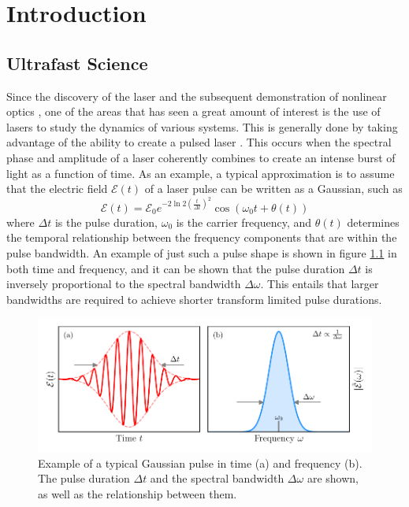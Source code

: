 \chapter{Introduction}
\label{chap:Intro}


\section{Ultrafast Science}

Since the discovery of the laser \cite{schawlowInfraredOpticalMasers1958, maimanStimulatedOpticalRadiation1960} and the subsequent demonstration of nonlinear optics \cite{frankenGenerationOpticalHarmonics1961, armstrongInteractionsLightWaves1962}, one of the areas that has seen a great amount of interest is the use of lasers to study the dynamics of various systems.  This is generally done by taking advantage of the ability to create a pulsed laser \cite{demariaPicosecondLaserPulses1971}.  This occurs when the spectral phase and amplitude of a laser coherently combines to create an intense burst of light as a function of time.  As an example, a typical approximation is to assume that the electric field $\mathcal{E}(t)$ of a laser pulse can be written as a Gaussian, such as
\begin{equation}
	\label{eqn:gaussian_pulse}
	\mathcal{E}(t) = \mathcal{E}_0 e^{-2\ln 2(\frac{t}{\Delta t})^2}\cos(\omega_0 t + \theta(t))
\end{equation}
where $\Delta t$ is the pulse duration, $\omega_0$ is the carrier frequency, and $\theta(t)$ determines the temporal relationship between the frequency components that are within the pulse bandwidth.  An example of just such a pulse shape is shown in figure \ref{fig:gaussian_pulse} in both time and frequency, and it can be shown that the pulse duration $\Delta t$ is inversely proportional to the spectral bandwidth $\Delta\omega$.  This entails that larger bandwidths are required to achieve shorter transform limited pulse durations.

\begin{figure}
	\centering
	\includegraphics[width=1.0\textwidth]{figures/Introduction/gaussian_pulse.pdf}
	\caption[Example of a typical Gaussian pulse in time and frequency]{Example of a typical Gaussian pulse in time (a) and frequency (b).  The pulse duration $\Delta t$ and the spectral bandwidth $\Delta\omega$ are shown, as well as the relationship between them.}
	\label{fig:gaussian_pulse}
\end{figure}

